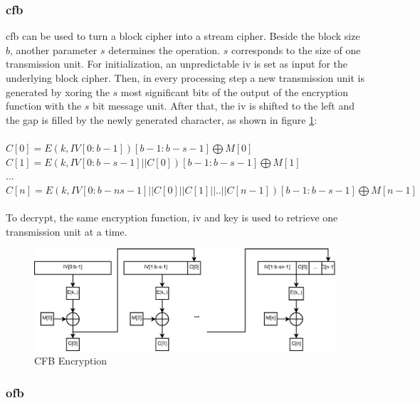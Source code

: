 \subsubsection{\gls{cfb}}

\gls{cfb} can be used to turn a block cipher into a stream cipher. Beside the block size $b$, another parameter $s$ determines the operation. $s$ corresponds
to the size of one transmission unit. For initialization, an unpredictable \gls{iv} is set as input for the underlying block cipher. Then, in every
processing step a new transmission unit is generated by \gls{xor}ing the $s$ most significant bits
of the output of the encryption function with the $s$ bit message unit. After that, the \gls{iv} is shifted to the left and the gap is filled
by the newly generated character, as shown in figure \ref{fig:cfb}:
\\
\\
 $C[0] = E(k, IV[0:b-1])[b-1:b-s-1] \bigoplus M[0]$\\
 $C[1] = E(k, IV[0:b-s-1] || C[0])[b-1:b-s-1] \bigoplus M[1]$\\
 ... \\
 $C[n] = E(k, IV[0:b-ns-1] || C[0] || C[1] || .. || C[n-1])[b-1:b-s-1] \bigoplus M[n-1]$\\
\\

To decrypt, the same encryption function, \gls{iv} and key is used to retrieve one transmission unit at a time.
 
\begin{figure}
    \centering
    \includegraphics[width=1\textwidth]{figures/CFB.eps}
    \caption{CFB Encryption}
    \label{fig:cfb}
\end{figure}

\subsubsection{\gls{ofb}}

